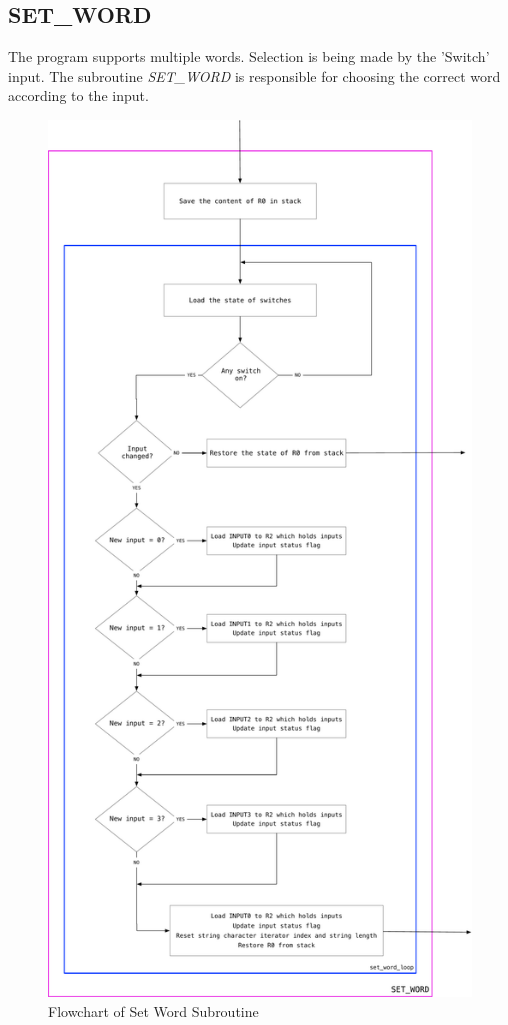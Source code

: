 \documentclass[titlepage]{article}
\begin{document}
	\subsection{SET\_WORD}
	The program supports multiple words. Selection is being made by the 'Switch' input. The subroutine \textit{SET\_WORD} is responsible for choosing the correct word according to the input.
	\begin{figure}[h]
		\centering
		\includegraphics[scale=.25]{../images/set_word.pdf}
		\caption{Flowchart of Set Word Subroutine}
	\end{figure}
	\newpage
\end{document}
